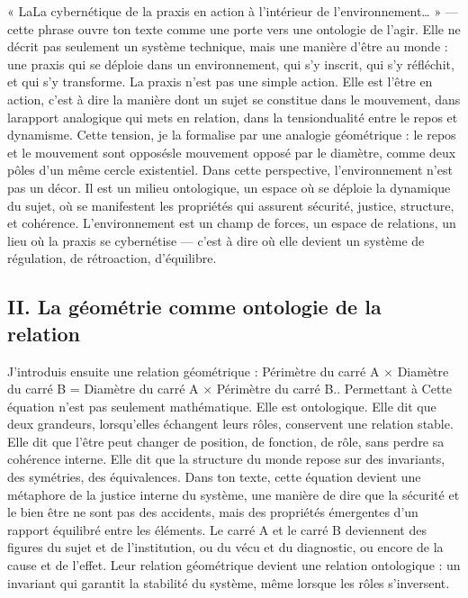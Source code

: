 \documentclass[12pt,a4paper]{article}
\begin{document}
« LaLa cybernétique de la praxis en action à l’intérieur de l’environnement… » — cette phrase ouvre ton texte comme une porte vers une ontologie de l’agir. Elle ne décrit pas seulement un système technique, mais une manière d’être au monde : une praxis qui se déploie dans un environnement, qui s’y inscrit, qui s’y réfléchit, et qui s’y transforme.
La praxis n’est pas une simple action. Elle est l’être en action, c’est à dire la manière dont un sujet se constitue dans le mouvement, dans larapport analogique qui mets en relation, dans la tensiondualité entre le repos et dynamisme. Cette tension, je la formalise par une analogie géométrique : le repos et le mouvement sont opposésle mouvement opposé par le diamètre, comme deux pôles d’un même cercle existentiel.
Dans cette perspective, l’environnement n’est pas un décor. Il est un milieu ontologique, un espace où se déploie la dynamique du sujet, où se manifestent les propriétés qui assurent sécurité, justice, structure, et cohérence. L’environnement est un champ de forces, un espace de relations, un lieu où la praxis se cybernétise — c’est à dire où elle devient un système de régulation, de rétroaction, d’équilibre.

\subsection*{II. La géométrie comme ontologie de la relation}
J’introduis ensuite une relation géométrique :
Périmètre du carré A × Diamètre du carré B = Diamètre du carré A × Périmètre du carré B.. Permettant à
Cette équation n’est pas seulement mathématique. Elle est ontologique.
Elle dit que deux grandeurs, lorsqu’elles échangent leurs rôles, conservent une relation stable. Elle dit que l’être peut changer de position, de fonction, de rôle, sans perdre sa cohérence interne. Elle dit que la structure du monde repose sur des invariants, des symétries, des équivalences.
Dans ton texte, cette équation devient une métaphore de la justice interne du système, une manière de dire que la sécurité et le bien être ne sont pas des accidents, mais des propriétés émergentes d’un rapport équilibré entre les éléments.
Le carré A et le carré B deviennent des figures du sujet et de l’institution, ou du vécu et du diagnostic, ou encore de la cause et de l’effet. Leur relation géométrique devient une relation ontologique : un invariant qui garantit la stabilité du système, même lorsque les rôles s’inversent.
\end{document}
